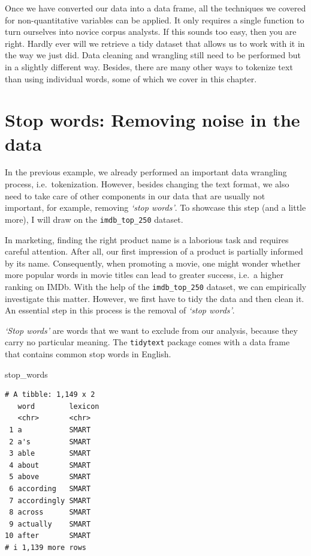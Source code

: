 \documentclass[
  letterpaper,
]{krantz}
\makeatletter
\newenvironment{Shaded}{\begin{snugshade}}{\end{snugshade}}
\newcommand{\NormalTok}[1]{\textcolor[rgb]{0.00,0.23,0.31}{#1}}
\newenvironment{kframe}{%
\medskip{}
\setlength{\fboxsep}{.8em}
 \def\at@end@of@kframe{}%
 \ifinner\ifhmode%
  \def\at@end@of@kframe{\end{minipage}}%
  \begin{minipage}{\columnwidth}%
 \fi\fi%
 \def\FrameCommand##1{\hskip\@totalleftmargin \hskip-\fboxsep
 \colorbox{shadecolor}{##1}\hskip-\fboxsep
     \hskip-\linewidth \hskip-\@totalleftmargin \hskip\columnwidth}%
 \MakeFramed {\advance\hsize-\width
   \@totalleftmargin\z@ \linewidth\hsize
   \@setminipage}}%
 {\par\unskip\endMakeFramed%
 \at@end@of@kframe}
\renewenvironment{Shaded}{\begin{kframe}}{\end{kframe}}
\makeatother
\begin{document}
Once we have converted our data into a data frame, all the techniques we
covered for non-quantitative variables can be applied. It only requires
a single function to turn ourselves into novice corpus analysts. If this
sounds too easy, then you are right. Hardly ever will we retrieve a tidy
dataset that allows us to work with it in the way we just did. Data
cleaning and wrangling still need to be performed but in a slightly
different way. Besides, there are many other ways to tokenize text than
using individual words, some of which we cover in this chapter.

\section{Stop words: Removing noise in the
data}\label{stop-words-removing-noise-in-the-data}

In the previous example, we already performed an important data
wrangling process, i.e.~tokenization. However, besides changing the text
format, we also need to take care of other components in our data that
are usually not important, for example, removing \emph{`stop words'}. To
showcase this step (and a little more), I will draw on the
\texttt{imdb\_top\_250} dataset.

In marketing, finding the right product name is a laborious task and
requires careful attention. After all, our first impression of a product
is partially informed by its name. Consequently, when promoting a movie,
one might wonder whether more popular words in movie titles can lead to
greater success, i.e.~a higher ranking on IMDb. With the help of the
\texttt{imdb\_top\_250} dataset, we can empirically investigate this
matter. However, we first have to tidy the data and then clean it. An
essential step in this process is the removal of \emph{`stop words'}.

\emph{`Stop words'} are words that we want to exclude from our analysis,
because they carry no particular meaning. The \texttt{tidytext} package
comes with a data frame that contains common stop words in English.

\begin{Shaded}
\begin{Highlighting}[]
\NormalTok{stop\_words}
\end{Highlighting}
\end{Shaded}

\begin{verbatim}
# A tibble: 1,149 x 2
   word        lexicon
   <chr>       <chr>  
 1 a           SMART  
 2 a's         SMART  
 3 able        SMART  
 4 about       SMART  
 5 above       SMART  
 6 according   SMART  
 7 accordingly SMART  
 8 across      SMART  
 9 actually    SMART  
10 after       SMART  
# i 1,139 more rows
\end{verbatim}
\end{document}
